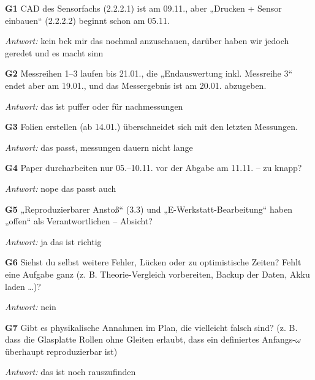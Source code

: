 {\par\noindent \textbf{G1} CAD des Sensorfachs (2.2.2.1) ist am 09.11., aber „Drucken + Sensor einbauen“ (2.2.2.2) beginnt schon am 05.11.\par
\par\noindent\emph{Antwort:} kein bck mir das nochmal anzuschauen, darüber haben wir jedoch geredet und es macht sinn\par\smallskip
\par\noindent \textbf{G2} Messreihen 1–3 laufen bis 21.01., die „Endauswertung inkl. Messreihe 3“ endet aber am 19.01., und das Messergebnis ist am 20.01. abzugeben.\par
\par\noindent\emph{Antwort:} das ist puffer oder für nachmessungen\par\smallskip
\par\noindent \textbf{G3} Folien erstellen (ab 14.01.) überschneidet sich mit den letzten Messungen.\par
\par\noindent\emph{Antwort:} das passt, messungen dauern nicht lange\par\smallskip
\par\noindent \textbf{G4} Paper durcharbeiten nur 05.–10.11. vor der Abgabe am 11.11. – zu knapp?\par
\par\noindent\emph{Antwort:} nope das passt auch\par\smallskip
\par\noindent \textbf{G5} „Reproduzierbarer Anstoß“ (3.3) und „E-Werkstatt-Bearbeitung“ haben „offen“ als Verantwortlichen – Absicht?\par
\par\noindent\emph{Antwort:} ja das ist richtig\par\smallskip
\par\noindent \textbf{G6} Siehst du selbst weitere Fehler, Lücken oder zu optimistische Zeiten? Fehlt eine Aufgabe ganz (z. B. Theorie-Vergleich vorbereiten, Backup der Daten, Akku laden …)?\par
\par\noindent\emph{Antwort:} nein\par\smallskip
\par\noindent \textbf{G7} Gibt es physikalische Annahmen im Plan, die vielleicht falsch sind? (z. B. dass die Glasplatte Rollen ohne Gleiten erlaubt, dass ein definiertes Anfangs-$\omega$ überhaupt reproduzierbar ist)\par
\par\noindent\emph{Antwort:} das ist noch rauszufinden\par\smallskip
}
